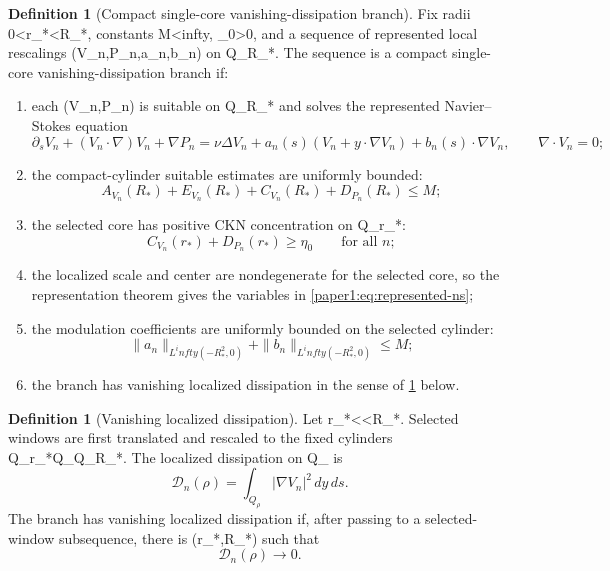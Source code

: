 \documentclass[11pt]{amsart}
\def\({}%
\def\){}%
\def\infty{infty}%
\theoremstyle{plain}
\theoremstyle{definition}
\newtheorem{definition}[theorem]{Definition}
\theoremstyle{remark}
\begin{document}
\begin{definition}[Compact single-core vanishing-dissipation branch]\label{paper1:def:single-core-branch}
Fix radii \(0<r_*<R_*\), constants \(M<\infty\), \(\eta_0>0\), and a sequence
of represented local rescalings \((V_n,P_n,a_n,b_n)\) on \(Q_{R_*}\).  The
sequence is a compact single-core vanishing-dissipation branch if:
\begin{enumerate}[label=\textup{(\roman*)}]
\item each \((V_n,P_n)\) is suitable on \(Q_{R_*}\) and solves the represented
      Navier--Stokes equation
      \begin{equation}\label{paper1:eq:represented-ns}
      \partial_s V_n+(V_n\cdot\nabla)V_n+\nabla P_n
      =\nu\Delta V_n+a_n(s)(V_n+y\cdot\nabla V_n)+b_n(s)\cdot\nabla V_n,
      \qquad \nabla\cdot V_n=0;
      \end{equation}
\item the compact-cylinder suitable estimates are uniformly bounded:
      \[
      A_{V_n}(R_*)+E_{V_n}(R_*)+C_{V_n}(R_*)+D_{P_n}(R_*)\le M;
      \]
\item the selected core has positive CKN concentration on \(Q_{r_*}\):
      \[
      C_{V_n}(r_*)+D_{P_n}(r_*)\ge\eta_0
      \qquad\text{for all }n;
      \]
\item the localized scale and center are nondegenerate for the selected core,
      so the representation theorem gives the variables in
      \eqref{paper1:eq:represented-ns};
\item the modulation coefficients are uniformly bounded on the selected cylinder:
      \[
      \|a_n\|_{L^\infty(-R_*^2,0)}+\|b_n\|_{L^\infty(-R_*^2,0)}\le M;
      \]
\item the branch has vanishing localized dissipation in the sense of
      \cref{paper1:def:localized-dissipation} below.
\end{enumerate}
\end{definition}

\begin{definition}[Vanishing localized dissipation]\label{paper1:def:localized-dissipation}
Let \(r_*<\rho<R_*\).  Selected windows are first translated and rescaled to the
fixed cylinders \(Q_{r_*}\Subset Q_\rho\Subset Q_{R_*}\).  The localized
dissipation on \(Q_\rho\) is
\[
  \mathcal D_n(\rho)=\int_{Q_\rho}|\nabla V_n|^2\,dy\,ds.
\]
The branch has vanishing localized dissipation if, after passing to a
selected-window subsequence, there is \(\rho\in(r_*,R_*)\) such that
\[
  \mathcal D_n(\rho)\to0.
\]
\end{definition}
\end{document}
